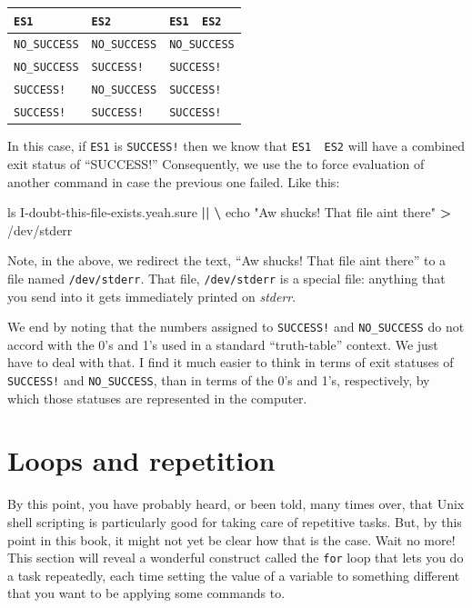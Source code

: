 \documentclass[]{krantz}
\makeatletter
\newenvironment{Shaded}{\begin{snugshade}}{\end{snugshade}}
\newcommand{\BuiltInTok}[1]{#1}
\newcommand{\FunctionTok}[1]{\textcolor[rgb]{0,0,0}{#1}}
\newcommand{\KeywordTok}[1]{\textcolor[rgb]{0.27,0.27,0.27}{\textbf{#1}}}
\newcommand{\NormalTok}[1]{#1}
\newcommand{\OperatorTok}[1]{\textcolor[rgb]{0.43,0.43,0.43}{\textbf{#1}}}
\newcommand{\StringTok}[1]{\textcolor[rgb]{0.5,0.5,0.5}{#1}}
\newenvironment{kframe}{%
\medskip{}
\setlength{\fboxsep}{.8em}
 \def\at@end@of@kframe{}%
 \ifinner\ifhmode%
  \def\at@end@of@kframe{\end{minipage}}%
  \begin{minipage}{\columnwidth}%
 \fi\fi%
 \def\FrameCommand##1{\hskip\@totalleftmargin \hskip-\fboxsep
 \colorbox{shadecolor}{##1}\hskip-\fboxsep
     \hskip-\linewidth \hskip-\@totalleftmargin \hskip\columnwidth}%
 \MakeFramed {\advance\hsize-\width
   \@totalleftmargin\z@ \linewidth\hsize
   \@setminipage}}%
 {\par\unskip\endMakeFramed%
 \at@end@of@kframe}
\renewenvironment{Shaded}{\begin{kframe}}{\end{kframe}}
\makeatother
\begin{document}
\begin{longtable}[]{@{}lll@{}}
\toprule
\texttt{ES1} & \texttt{ES2} & \texttt{ES1\ \textbar{}\textbar{}\ ES2}\tabularnewline
\midrule
\endhead
\texttt{NO\_SUCCESS} & \texttt{NO\_SUCCESS} & \texttt{NO\_SUCCESS}\tabularnewline
\texttt{NO\_SUCCESS} & \texttt{SUCCESS!} & \texttt{SUCCESS!}\tabularnewline
\texttt{SUCCESS!} & \texttt{NO\_SUCCESS} & \texttt{SUCCESS!}\tabularnewline
\texttt{SUCCESS!} & \texttt{SUCCESS!} & \texttt{SUCCESS!}\tabularnewline
\bottomrule
\end{longtable}

In this case, if \texttt{ES1} is \texttt{SUCCESS!} then we know that
\texttt{ES1\ \textbar{}\textbar{}\ ES2} will have a combined exit status of ``SUCCESS!''
Consequently, we use the \texttt{\textbar{}\textbar{}} to force evaluation of
another command in case the previous one failed. Like this:

\begin{Shaded}
\begin{Highlighting}[]
\FunctionTok{ls}\NormalTok{ I-doubt-this-file-exists.yeah.sure }\KeywordTok{||} \KeywordTok{\textbackslash{}}
  \BuiltInTok{echo} \StringTok{"Aw shucks! That file aint there"} \OperatorTok{>}\NormalTok{ /dev/stderr}
\end{Highlighting}
\end{Shaded}

Note, in the above, we redirect the text, ``Aw shucks! That file aint there'' to
a file named \texttt{/dev/stderr}. That file, \texttt{/dev/stderr} is a special file: anything
that you send into it gets immediately printed on \emph{stderr}.

We end by noting that the numbers assigned to \texttt{SUCCESS!} and \texttt{NO\_SUCCESS} do
not accord with the 0's and 1's used in a standard ``truth-table'' context. We just
have to deal with that. I find it much easier to think in terms of exit statuses
of \texttt{SUCCESS!} and \texttt{NO\_SUCCESS}, than in terms of the 0's and 1's, respectively,
by which those statuses are represented in the computer.

\hypertarget{loops-and-repetition}{%
\section{Loops and repetition}\label{loops-and-repetition}}

By this point, you have probably heard, or been told,
many times over, that Unix shell scripting is particularly good
for taking care of repetitive tasks. But, by this point in this
book, it might not yet be clear how that is the case. Wait no
more! This section will reveal a wonderful construct called the
\texttt{for} loop that lets you do a task repeatedly, each time setting
the value of a variable to something different that you want to
be applying some commands to.
\end{document}
